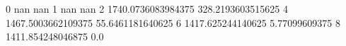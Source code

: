 0 nan nan
1 nan nan
2 1740.0736083984375 328.2193603515625
4 1467.5003662109375 55.6461181640625
6 1417.625244140625 5.77099609375
8 1411.854248046875 0.0
